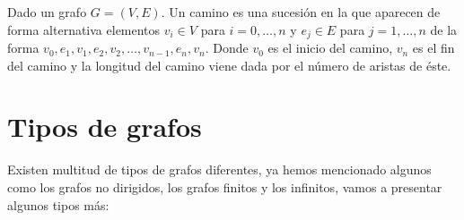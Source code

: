 \begin{defi} 
	Dado un grafo $G=(V,E)$. Un camino es una sucesión en la que aparecen de forma alternativa elementos $v_{i} \in V$ para $i=0,\dots,n$ y $e_{j} \in E$ para $j=1,\dots,n$ de la forma $v_{0},e_{1},v_{1},e_{2},v_{2},\dots,v_{n-1},e_{n},v_{n}$. Donde $v_{0}$ es el inicio del camino, $v_{n}$ es el fin del camino y la longitud del camino viene dada por el número de aristas de éste.
\end{defi}

\section{Tipos de grafos}

Existen multitud de tipos de grafos diferentes, ya hemos mencionado algunos como los grafos no dirigidos, los grafos finitos y los infinitos, vamos a presentar algunos tipos más:
